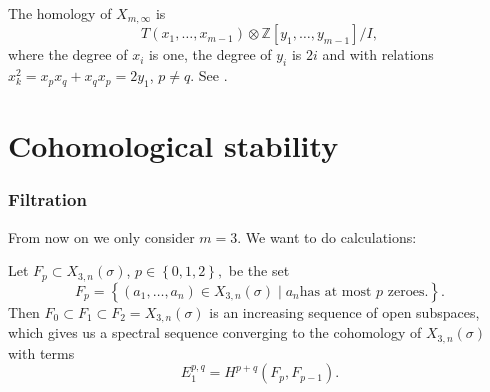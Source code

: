 \documentclass{beamer} %
\newcommand{\Z}{\mathbb{Z}}
\newcommand{\set}[1]{\left\{ #1 \right\}}
\begin{document}
\begin{frame}
  \begin{corollary}
    The homology of $X_{m,\infty}$ is
    \[ T(x_1,\dots,x_{m-1}) \otimes \Z[y_1,\dots,y_{m-1}] / I, \]
    where the degree of $x_i$ is one, the degree of $y_i$ is $2i$ and
    with relations $x_k^2 = x_px_q + x_qx_p = 2y_1$, $p\neq q$. See
    \cite[Thm~4.1]{grbic}.
  \end{corollary}
\end{frame}

\section{Cohomological stability}

\begin{frame}
  \frametitle{Filtration}
  From now on we only consider $m = 3$. We want to do calculations:
  \begin{definition}
    Let $F_p \subset X_{3,n}(\sigma)$, $p\in\set{0,1,2},$ be the set
    \[ F_p = \set{ (a_1,\dots,a_n) \in X_{3,n}(\sigma) \mid a_n \text{
        has at most } p \text{ zeroes}.}. \] \pause
    Then $F_0 \subset F_1 \subset F_2 = X_{3,n}(\sigma)$ is an
    increasing sequence of open subspaces, which gives us a spectral
    sequence converging to the cohomology of $X_{3,n}(\sigma)$ with
    terms
    \[ E_1^{p,q} = H^{p+q}(F_p,F_{p-1}). \]
  \end{definition}
\end{frame}
\end{document}
